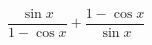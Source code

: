 \begin{ex}[type=expression]
	\begin{condition}
		\( \dfrac{\sin x}{1-\cos x}+\dfrac{1-\cos x}{\sin x} \)
	\end{condition}
\end{ex}